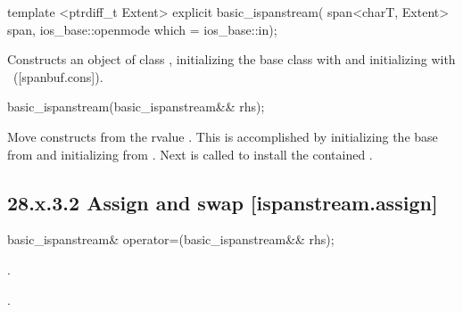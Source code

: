 \documentclass[ebook,11pt,article]{memoir}
\renewcommand{\iref}[1]{[#1]}
\begin{document}
\begin{itemdecl}
template <ptrdiff_t Extent>
explicit basic_ispanstream(
  span<charT, Extent> span,
  ios_base::openmode which = ios_base::in);
\end{itemdecl}

\begin{itemdescr}
\pnum
\effects
Constructs an object of class
,
initializing the base class with
and initializing  with
~(\iref{spanbuf.cons}).
\end{itemdescr}

\begin{itemdecl}
basic_ispanstream(basic_ispanstream&& rhs);
\end{itemdecl}

\begin{itemdescr}
\pnum
\effects 
Move constructs from the rvalue .
This is accomplished by 
initializing the base  from  
and initializing  from .
Next  is called to
install the contained .
\end{itemdescr}

\subsection{28.x.3.2 Assign and swap [ispanstream.assign]}
\label{ispanstream.assign}

\begin{itemdecl}
basic_ispanstream& operator=(basic_ispanstream&& rhs);
\end{itemdecl}

\begin{itemdescr}
\pnum
\effects 
{} .

\pnum
\returns {}.
\end{itemdescr}
\end{document}
